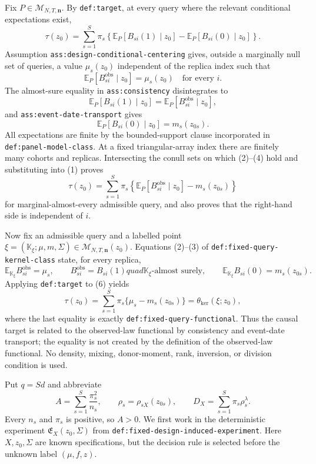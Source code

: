 Fix \(P\in\mathcal M_{N,T,\mathbf n}\).  By \texttt{def:target}, at every query where the relevant conditional expectations exist,
\[
 \tau(z_0)=\sum_{s=1}^{S}\pi_s\left\{
 \mathbb E_P[B_{si}(1)\mid z_0]-
 \mathbb E_P[B_{si}(0)\mid z_0]\right\}.                 \tag{1}
\]
Assumption \texttt{ass:design-conditional-centering} gives, outside a marginally null set of queries, a value \(\mu_s(z_0)\) independent of the replica index such that
\[
 \mathbb E_P[B_{si}^{\mathrm{obs}}\mid z_0]=\mu_s(z_0)
 \quad\text{for every }i.                                  \tag{2}
\]
The almost-sure equality in \texttt{ass:consistency} disintegrates to
\[
 \mathbb E_P[B_{si}(1)\mid z_0]
 =\mathbb E_P[B_{si}^{\mathrm{obs}}\mid z_0],               \tag{3}
\]
and \texttt{ass:event-date-transport} gives
\[
 \mathbb E_P[B_{si}(0)\mid z_0]=m_s(z_{0s}).                \tag{4}
\]
All expectations are finite by the bounded-support clause incorporated in \texttt{def:panel-model-class}.  At a fixed triangular-array index there are finitely many cohorts and replicas.  Intersecting the conull sets on which (2)--(4) hold and substituting into (1) proves
\[
 \tau(z_0)=\sum_{s=1}^{S}\pi_s\left\{
 \mathbb E_P[B_{si}^{\mathrm{obs}}\mid z_0]-m_s(z_{0s})
 \right\}                                                   \tag{5}
\]
for marginal-almost-every admissible query, and also proves that the right-hand side is independent of \(i\).

Now fix an admissible query and a labelled point
\(\xi=(\mathbb K_\xi;\mu,m,\Sigma)\in
\mathcal M_{N,T,\mathbf n}(z_0)\).  Equations (2)--(3) of
\texttt{def:fixed-query-kernel-class} state, for every replica,
\[
 \mathbb E_{\mathbb K_\xi}B_{si}^{\mathrm{obs}}=\mu_s,
 \qquad B_{si}^{\mathrm{obs}}=B_{si}(1)quad
 \mathbb K_\xi\text{-almost surely},
 \qquad
 \mathbb E_{\mathbb K_\xi}B_{si}(0)=m_s(z_{0s}).           \tag{6}
\]
Applying \texttt{def:target} to (6) yields
\[
 \tau(z_0)=\sum_{s=1}^{S}\pi_s\{\mu_s-m_s(z_{0s})\}
 =\theta_{\mathrm{ker}}(\xi;z_0),                           \tag{7}
\]
where the last equality is exactly \texttt{def:fixed-query-functional}.  Thus the causal target is related to the observed-law functional by consistency and event-date transport; the equality is not created by the definition of the observed-law functional.  No density, mixing, donor-moment, rank, inversion, or division condition is used.

Put \(q=Sd\) and abbreviate
\[
 A=\sum_{s=1}^{S}\frac{\pi_s^2}{n_s},
 \qquad
 \rho_s=\rho_{sX}(z_{0s}),
 \qquad
 D_X=\sum_{s=1}^{S}\pi_s\rho_s^\lambda.                   \tag{1}
\]
Every \(n_s\) and \(\pi_s\) is positive, so \(A>0\).  We first work in the deterministic experiment \(\mathfrak E_X(z_0,\Sigma)\) from \texttt{def:fixed-design-induced-experiment}.  Here \(X,z_0,\Sigma\) are known specifications, but the decision rule is selected before the unknown label \((\mu,f,z)\).

